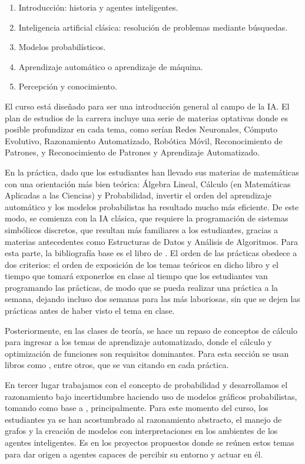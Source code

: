 \begin{enumerate}
 \item Introducción: historia y agentes inteligentes.
 \item Inteligencia artificial clásica: resolución de problemas mediante búsquedas.
 \item Modelos probabilísticos.
 \item Aprendizaje automático o aprendizaje de máquina.
 \item Percepción y conocimiento.
\end{enumerate}

El curso está diseñado para ser una introducción general al campo de la IA.  El plan de estudios de la carrera incluye una serie de materias optativas donde es posible profundizar en cada tema, como serían Redes Neuronales, Cómputo Evolutivo, Razonamiento Automatizado, Robótica Móvil, Reconocimiento de Patrones, y Reconocimiento de Patrones y Aprendizaje Automatizado.

En la práctica, dado que los estudiantes han llevado sus materias de matemáticas con una orientación más bien teórica: Álgebra Lineal, Cálculo (en Matemáticas Aplicadas a las Ciencias) y Probabilidad, invertir el orden del aprendizaje automático y los modelos probabilistas ha resultado mucho más eficiente.  De este modo, se comienza con la IA clásica, que requiere la programación de sistemas simbólicos discretos, que resultan más familiares a los estudiantes, gracias a materias antecedentes como Estructuras de Datos y Análisis de Algoritmos.  Para esta parte, la bibliografía base es el libro de \cite{StuartJRussell2022}.  El orden de las prácticas obedece a dos criterios: el orden de exposición de los temas teóricos en dicho libro y el tiempo que tomará exponerlos en clase al tiempo que los estudiantes van programando las prácticas, de modo que se pueda realizar una práctica a la semana, dejando incluso dos semanas para las más laboriosas, sin que se dejen las prácticas antes de haber visto el tema en clase.

Posteriormente, en las clases de teoría, se hace un repaso de conceptos de cálculo para ingresar a los temas de aprendizaje automatizado, donde el cálculo y optimización de funciones son requisitos dominantes.  Para esta sección se usan libros como \cite{Nengnevitsky2005, Mitchell1997}, entre otros, que se van citando en cada práctica.

En tercer lugar trabajamos con el concepto de probabilidad y desarrollamos el razonamiento bajo incertidumbre haciendo uso de modelos gráficos probabilistas, tomando como base a \cite{KollerFriedman2009}, principalmente.  Para este momento del curso, los estudiantes ya se han acostumbrado al razonamiento abstracto, el manejo de grafos y la creación de modelos con interpretaciones en los ambientes de los agentes inteligentes.  Es en los proyectos propuestos donde se reúnen estos temas para dar origen a agentes capaces de percibir su entorno y actuar en él.

